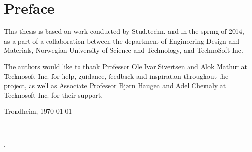 \section*{Preface}

This thesis is based on work conducted by Stud.techn. \myauthorA and \myauthorB in the spring of 2014, as a part of a collaboration between the department of Engineering Design and Materials, Norwegian University of Science and Technology, and TechnoSoft Inc.

The authors would like to thank Professor Ole Ivar Sivertsen and Alok Mathur at Technosoft Inc. for help, guidance, feedback and inspiration throughout the project, as well as Associate Professor Bjørn Haugen and Adel Chemaly at Technosoft Inc. for their support.



Trondheim, \today


\rule{10cm}{0.5pt}\\
\indent \myauthorA, \myauthorB \\